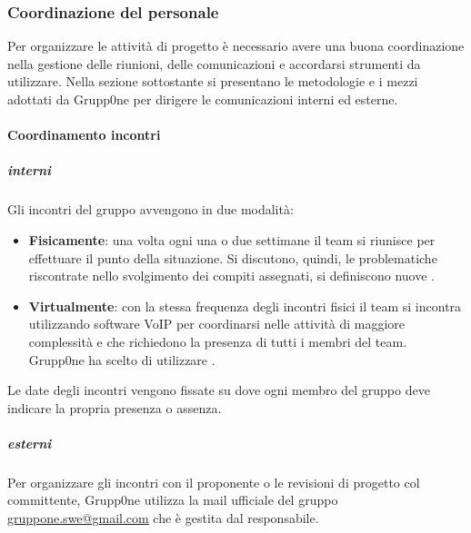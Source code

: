 \documentclass[../norme-di-progetto.tex]{subfiles}
\begin{document}
\subsubsection{Coordinazione del personale}
\label{subs:coordinazione del personale}
Per organizzare le attività di progetto è necessario avere una buona coordinazione nella gestione delle riunioni, delle comunicazioni e accordarsi strumenti da utilizzare. Nella sezione sottostante si presentano le metodologie e i mezzi adottati da Grupp0ne per dirigere le comunicazioni interni ed esterne.
\paragraph{Coordinamento incontri}
\label{par:coordinamento incontri}
\subparagraph{interni}
\label{subp:interni}
Gli incontri del gruppo avvengono in due modalità:
\begin{itemize}
	\item \textbf{Fisicamente}: una volta ogni una o due settimane il team si riunisce per effettuare il punto della situazione. Si discutono, quindi, le problematiche riscontrate nello svolgimento dei compiti assegnati, si definiscono nuove .
	\item \textbf{Virtualmente}: con la stessa frequenza degli incontri fisici il team si incontra utilizzando software VoIP per coordinarsi nelle attività di maggiore complessità e che richiedono la presenza di tutti i membri del team. Grupp0ne ha scelto di utilizzare .
\end{itemize}
Le date degli incontri vengono fissate su  dove ogni membro del gruppo deve indicare la propria presenza o assenza.
\subparagraph{esterni}
\label{subp:esterni}
 Per organizzare gli incontri con il proponente o le revisioni di progetto col committente, Grupp0ne utilizza la mail ufficiale del gruppo \url{gruppone.swe@gmail.com} che è gestita dal responsabile.
\end{document}

